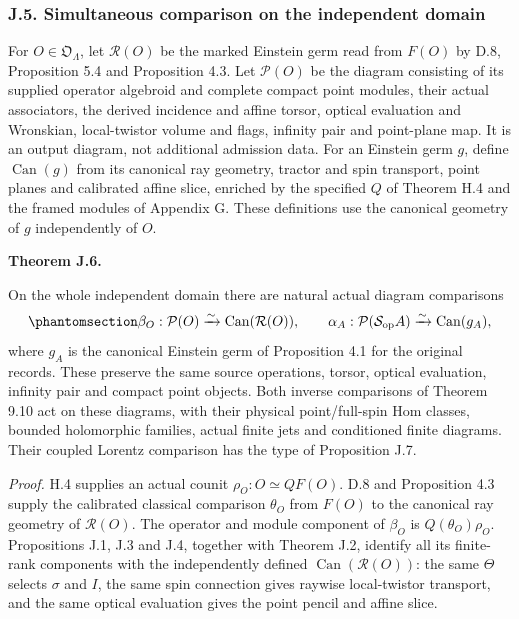 \documentclass[
  english,
  11pt,
  reqno]{amsart}
\makeatletter
\newcommand{\pandocstatementheading}[1]{%
  \par\addpenalty{\@beginparpenalty}%
  \addvspace{.5\baselineskip plus .2\baselineskip minus .2\baselineskip}%
  {\normalfont\bfseries #1\par}%
  \nobreak\@afterindenttrue\@afterheading
}
\makeatother
\begin{document}
\protect{}\label{sec:gg-simultaneous-comparison-proof}

\subsubsection{J.5. Simultaneous comparison on the independent
domain}\label{j.5.-simultaneous-comparison-on-the-independent-domain}

For \(O\in\mathfrak O_\Lambda\), let \(\mathcal R(O)\) be the marked
Einstein germ read from \(F(O)\) by D.8, Proposition 5.4 and Proposition
4.3. Let \(\mathcal P(O)\) be the diagram consisting of its supplied
operator algebroid and complete compact point modules, their actual
associators, the derived incidence and affine torsor, optical evaluation
and Wronskian, local-twistor volume and flags, infinity pair and
point-plane map. It is an output diagram, not additional admission data.
For an Einstein germ \(g\), define \(\operatorname{Can}(g)\) from its
canonical ray geometry, tractor and spin transport, point planes and
calibrated affine slice, enriched by the specified \(Q\) of Theorem H.4
and the framed modules of Appendix G. These definitions use the
canonical geometry of \(g\) independently of \(O\).

\pandocstatementheading{\protect{}\label{thm:gg-simultaneous-projective-comparison}Theorem J.6.}

On the whole independent domain there are natural actual diagram
comparisons
\begin{equation}\protect\phantomsection\label{eq:gg-simultaneous-diagram-comparisons}{
 \beta_O:\mathcal P(O)\xrightarrow{\sim}
       \operatorname{Can}(\mathcal R(O)),\qquad
 \alpha_A:\mathcal P(\mathcal S_{\mathrm{op}}A)
       \xrightarrow{\sim}\operatorname{Can}(g_A),
}\end{equation} where \(g_A\) is the canonical Einstein germ of
Proposition 4.1 for the original records. These preserve the same source
operations, torsor, optical evaluation, infinity pair and compact point
objects. Both inverse comparisons of Theorem 9.10 act on these diagrams,
with their physical point/full-spin Hom classes, bounded holomorphic
families, actual finite jets and conditioned finite diagrams. Their
coupled Lorentz comparison has the type of Proposition J.7.

\emph{Proof.} H.4 supplies an actual counit \(\rho_O:O\simeq QF(O)\).
D.8 and Proposition 4.3 supply the calibrated classical comparison
\(\theta_O\) from \(F(O)\) to the canonical ray geometry of
\(\mathcal R(O)\). The operator and module component of \(\beta_O\) is
\(Q(\theta_O)\rho_O\). Propositions J.1, J.3 and J.4, together with
Theorem J.2, identify all its finite-rank components with the
independently defined \(\operatorname{Can}(\mathcal R(O))\): the same
\(\Theta\) selects \(\sigma\) and \(I\), the same spin connection gives
raywise local-twistor transport, and the same optical evaluation gives
the point pencil and affine slice.
\end{document}
